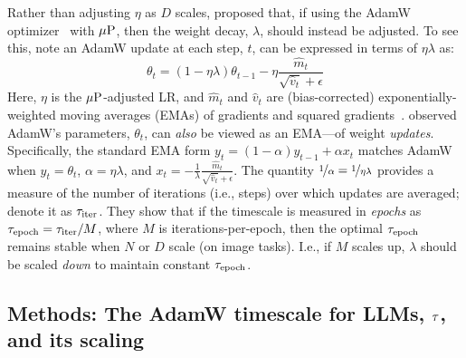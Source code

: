 Rather than adjusting $\eta$ as $D$ scales, \citet{wang2024how}
proposed that, if using the AdamW
optimizer~\citep{loshchilov2017decoupled} with $\mbox{$\mu$P}$, then the weight
decay, $\lambda$, should instead be adjusted.
%
To see this, note an AdamW update at each step, $t$, can be expressed
in terms of $\eta \lambda$ as:
\begin{equation}\label{eq:adamw}
\theta_t = (1 - \eta\lambda)\theta_{t-1} - \eta \frac{\hat{m}_t}{\sqrt{\hat{v}_t} + \epsilon}
\end{equation}
%
Here, $\eta$ is the $\mbox{$\mu$P}$-adjusted LR, and $\hat{m}_t$ and
$\hat{v}_t$ are (bias-corrected) exponentially-weighted moving
averages (EMAs) of gradients and squared
gradients~\citep{kingma2014adam}. \citet{wang2024how} observed AdamW's
parameters, $\theta_t$, can \emph{also} be viewed as an EMA---of
weight \emph{updates}.  Specifically, the standard EMA form \mbox{$y_t
  = (1 - \alpha)y_{t-1} + \alpha x_t$} matches AdamW when
\mbox{$y_t=\theta_t$}, \mbox{$\alpha=\eta\lambda$}, and
\mbox{$x_t=-\frac{1}{\lambda}\frac{\hat{m}_t}{\sqrt{\hat{v}_t} + \epsilon}$}.
The quantity $\nicefrac{1}{\alpha} = \nicefrac{1}{\eta\lambda}$
provides a measure of the number of iterations (i.e., steps) over
which updates are averaged;
\citet{wang2024how} denote it as $\tau_\text{iter}$.
%
They show that if the timescale is measured in \emph{epochs} as
$\tau_\text{epoch} = {\tau_\text{iter}}/{M}$, where $M$ is iterations-per-epoch, then
the optimal $\tau_\text{epoch}$ remains stable when $N$ or $D$ scale (on
image tasks).  I.e., if $M$ scales up, $\lambda$ should be
scaled \emph{down} to maintain constant $\tau_\text{epoch}$.
%
%
%

\subsection{Methods: The AdamW timescale for LLMs, $\tau$, and its scaling}\label{sec:tema_methods}


